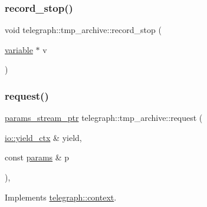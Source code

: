\mbox{\label{classtelegraph_1_1tmp__archive_a92ecdf029db73b48ca0d7eaf2838a492}} 
\subsubsection{\texorpdfstring{record\+\_\+stop()}{record\_stop()}}
{\footnotesize\ttfamily void telegraph\+::tmp\+\_\+archive\+::record\+\_\+stop (\begin{DoxyParamCaption}\item[{\hyperlink{classtelegraph_1_1variable}{variable} $\ast$}]{v }\end{DoxyParamCaption})}

\mbox{\label{classtelegraph_1_1tmp__archive_a688a661b85092244e5634f9c3e380f94}} 
\subsubsection{\texorpdfstring{request()}{request()}}
{\footnotesize\ttfamily \hyperlink{namespacetelegraph_ad071241508ea0f86c7de0686016f9ca9}{params\+\_\+stream\+\_\+ptr} telegraph\+::tmp\+\_\+archive\+::request (\begin{DoxyParamCaption}\item[{\hyperlink{structboost_1_1asio_1_1yield__ctx}{io\+::yield\+\_\+ctx} \&}]{yield,  }\item[{const \hyperlink{classtelegraph_1_1params}{params} \&}]{p }\end{DoxyParamCaption})\hspace{0.3cm}{\ttfamily [override]}, {\ttfamily [virtual]}}



Implements \hyperlink{classtelegraph_1_1context_a6765d7fa22fe99b9a6723c511396b781}{telegraph\+::context}.

\mbox{\label{classtelegraph_1_1tmp__archive_a10adc383103f4183e0a37485a5406cf1}} 
